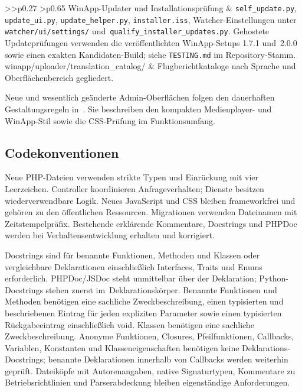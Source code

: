 \documentclass[11pt,a4paper]{article}
\newcommand{\filepath}[1]{\path{#1}}
\begin{document}
\begin{longtable}{%
    >{\ttfamily}>{\hspace{0pt}}p{0.27\linewidth}%
    >{\hspace{0pt}}p{0.65\linewidth}%
}
WinApp-Updater und Installationsprüfung & \texttt{self\_update.py}, \texttt{update\_ui.py}, \texttt{update\_helper.py}, \texttt{installer.iss}, Watcher-Einstellungen unter \texttt{watcher/ui/settings/} und~\texttt{qualify\_installer\_updates.py}. Gehostete Updateprüfungen verwenden die veröffentlichten WinApp-Setups 1.7.1 und~2.0.0 sowie einen exakten Kandidaten-Build; siehe \texttt{TESTING.md} im Repository-Stamm.\\
winapp/uploader/translation\_catalog/ & Flugberichtkataloge nach Sprache und Oberflächenbereich gegliedert.\\
\bottomrule
\end{longtable}

Neue und wesentlich geänderte Admin-Oberflächen folgen den dauerhaften
Gestaltungsregeln in~\filepath{docs/ADMIN_DESIGN.md}. Sie beschreiben den
kompakten Medienplayer- und WinApp-Stil sowie die CSS-Prüfung im
Funktionsumfang.

\subsection{Codekonventionen}

Neue PHP-Dateien verwenden strikte Typen und Einrückung mit vier Leerzeichen.
Controller koordinieren Anfrageverhalten; Dienste besitzen wiederverwendbare
Logik. Neues JavaScript und CSS bleiben frameworkfrei und gehören zu den
öffentlichen Ressourcen. Migrationen verwenden Dateinamen mit Zeitstempelpräfix.
Bestehende erklärende Kommentare, Docstrings und PHPDoc werden bei
Verhaltensentwicklung erhalten und korrigiert.

Docstrings sind für benannte Funktionen, Methoden und Klassen oder vergleichbare
Deklarationen einschließlich Interfaces, Traits und Enums erforderlich.
PHPDoc/JSDoc steht unmittelbar über der Deklaration; Python-Docstrings stehen
zuerst im~Deklarationskörper. Benannte Funktionen und Methoden benötigen eine
sachliche Zweckbeschreibung, einen typisierten und beschriebenen Eintrag für
jeden expliziten Parameter sowie einen typisierten Rückgabeeintrag
einschließlich void. Klassen benötigen eine sachliche Zweckbeschreibung. Anonyme
Funktionen, Closures, Pfeilfunktionen, Callbacks, Variablen, Konstanten und
Klasseneigenschaften benötigen keine Deklarations-Docstrings; benannte
Deklarationen innerhalb von Callbacks werden weiterhin geprüft. Dateiköpfe mit
Autorenangaben, native Signaturtypen, Kommentare zu Betriebsrichtlinien und
Parserabdeckung bleiben eigenständige Anforderungen.
\end{document}
